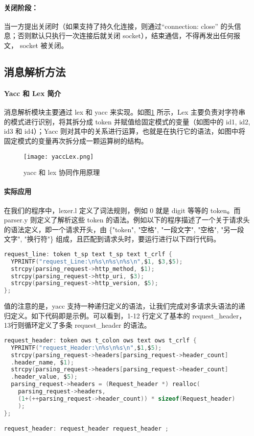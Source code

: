 \paragraph*{关闭阶段：}当一方提出关闭时（如果支持了持久化连接，则通过“connection: close” 的头信息；否则默认只执行一次连接后就关闭 socket），结束通信，不得再发出任何报文， socket 被关闭。


\subsection{消息解析方法}

\paragraph*{Yacc 和 Lex 简介} 消息解析模块主要通过 lex 和 yacc 来实现。如图\ref{fig:yacclex} 所示，Lex 主要负责对字符串的模式进行识别，将其拆分成 token 并赋值给固定模式的变量（如图中的 id1, id2, id3 和 id4）；Yacc 则对其中的关系进行运算，也就是在执行它的语法，如图中将固定模式的变量再次拆分成一颗运算树的结构。

\begin{figure}[htbp!]
  \centering
  \texttt{[image: yaccLex.png]}
  \caption{yacc 和 lex 协同作用原理}\label{fig:yacclex}
\end{figure}

\paragraph*{实际应用} 在我们的程序中，lexer.l 定义了词法规则，例如 0 就是 digit 等等的 token。而 parser.y 则定义了解析这些 token 的语法。例如以下的程序描述了一个关于请求头的语法定义，即一个请求开头，由 \{"token", "空格", "一段文字", "空格", "另一段文字", "换行符"\} 组成，且匹配到请求头时，要运行进行以下四行代码。

\begin{lstlisting}[language=c, name=parser.y Example]
request_line: token t_sp text t_sp text t_crlf {
  YPRINTF("request_Line:\n%s\n%s\n%s\n",$1, $3,$5);
  strcpy(parsing_request->http_method, $1);
  strcpy(parsing_request->http_uri, $3);
  strcpy(parsing_request->http_version, $5);
};
\end{lstlisting}

值的注意的是，yacc 支持一种递归定义的语法，让我们完成对多请求头语法的递归定义。如下代码即是示例。可以看到，1-12 行定义了基本的 request\_header，13行则循环定义了多条 request\_header 的语法。

\begin{lstlisting}[language=c, name=parser.y Example of Recursive Definition]
request_header: token ows t_colon ows text ows t_crlf {
  YPRINTF("request_Header:\n%s\n%s\n",$1,$5);
  strcpy(parsing_request->headers[parsing_request->header_count]
  .header_name, $1);
  strcpy(parsing_request->headers[parsing_request->header_count]
  .header_value, $5);
  parsing_request->headers = (Request_header *) realloc(
    parsing_request->headers, 
    (1+(++parsing_request->header_count)) * sizeof(Request_header)
    ); 
};

request_header: request_header request_header ;
\end{lstlisting}

